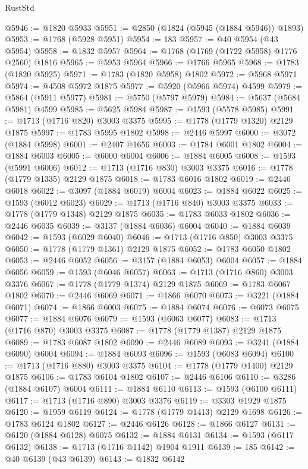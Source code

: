 \begin{lexlean}{RustStd}
\begin{coremodule}
{\begin{coremodule}
{{{{{{{{{{{{{{{{{{{{{{{{{{{{{{{{{{{{{{{{{{{{{{{@5946 := @1820 @5933
@5951 := @2850 (@1824 (@5945 (@1884 @5946)) @1893)
@5953 := @1768 (@5928 @5951)
@5954 := 183
@5957 := @40 @5954 (@43 @5954)
@5958 := @1832 @5957
@5964 := @1768 (@1769 (@1722 @5958) @1776 @2560) @1816
@5965 := @5953 @5964
@5966 := @1766 @5965
@5968 := @1783 (@1820 @5925)
@5971 := @1783 (@1820 @5958) @1802
@5972 := @5968 @5971
@5974 := @4508 @5972 @1875
@5977 := @5920 (@5966 @5974) @4599
@5979 := @5864 (@5911 @5977)
@5981 := @5750 (@5797 @5979)
@5984 := @5637 (@5684 @5981) @4599
@5985 := @5625 @5984
@5987 := @1593 (@5578 @5985)
@5991 := @1713 (@1716 @820) @3003 @3375
@5995 := @1778 (@1779 @1320) @2129 @1875
@5997 := @1783 @5995 @1802
@5998 := @2446 @5997
@6000 := @3072 (@1884 @5998)
@6001 := @2407 @1656
@6003 := @1784 @6001 @1802
@6004 := @1884 @6003
@6005 := @6000 @6004
@6006 := @1884 @6005
@6008 := @1593 (@5991 @6006)
@6012 := @1713 (@1716 @830) @3003 @3375
@6016 := @1778 (@1779 @1335) @2129 @1875
@6018 := @1783 @6016 @1802
@6019 := @2446 @6018
@6022 := @3097 (@1884 @6019) @6004
@6023 := @1884 @6022
@6025 := @1593 (@6012 @6023)
@6029 := @1713 (@1716 @840) @3003 @3375
@6033 := @1778 (@1779 @1348) @2129 @1875
@6035 := @1783 @6033 @1802
@6036 := @2446 @6035
@6039 := @3137 (@1884 @6036) @6004
@6040 := @1884 @6039
@6042 := @1593 (@6029 @6040)
@6046 := @1713 (@1716 @850) @3003 @3375
@6050 := @1778 (@1779 @1361) @2129 @1875
@6052 := @1783 @6050 @1802
@6053 := @2446 @6052
@6056 := @3157 (@1884 @6053) @6004
@6057 := @1884 @6056
@6059 := @1593 (@6046 @6057)
@6063 := @1713 (@1716 @860) @3003 @3376
@6067 := @1778 (@1779 @1374) @2129 @1875
@6069 := @1783 @6067 @1802
@6070 := @2446 @6069
@6071 := @1866 @6070
@6073 := @3221 (@1884 @6071)
@6074 := @1866 @6003
@6075 := @1884 @6074
@6076 := @6073 @6075
@6077 := @1884 @6076
@6079 := @1593 (@6063 @6077)
@6083 := @1713 (@1716 @870) @3003 @3375
@6087 := @1778 (@1779 @1387) @2129 @1875
@6089 := @1783 @6087 @1802
@6090 := @2446 @6089
@6093 := @3241 (@1884 @6090) @6004
@6094 := @1884 @6093
@6096 := @1593 (@6083 @6094)
@6100 := @1713 (@1716 @880) @3003 @3375
@6104 := @1778 (@1779 @1400) @2129 @1875
@6106 := @1783 @6104 @1802
@6107 := @2446 @6106
@6110 := @3286 (@1884 @6107) @6004
@6111 := @1884 @6110
@6113 := @1593 (@6100 @6111)
@6117 := @1713 (@1716 @890) @3003 @3376
@6119 := @3303 @1929 @1875
@6120 := @1959 @6119
@6124 := @1778 (@1779 @1413) @2129 @1698
@6126 := @1783 @6124 @1802
@6127 := @2446 @6126
@6128 := @1866 @6127
@6131 := @6120 (@1884 @6128) @6075
@6132 := @1884 @6131
@6134 := @1593 (@6117 @6132)
@6138 := @1713 (@1716 @1142) @1904 @1911
@6139 := 185
@6142 := @40 @6139 (@43 @6139)
@6143 := @1832 @6142
}}}}}}}}}}}}}}}}}}}}}}}}}}}}}}}}}}}}}}}}}}}}}}}
\end{coremodule}}
\end{coremodule}
\end{lexlean}

